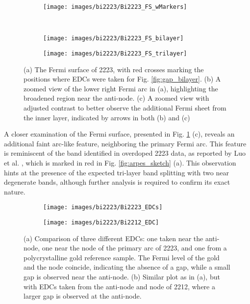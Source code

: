 \begin{figure}[t!]
	\centering
	\begin{subfigure}[b]{0.6\textwidth}
		\texttt{[image: images/bi2223/Bi2223\_FS\_wMarkers]}
		\caption{}
	\end{subfigure}
	\\
	\begin{subfigure}[b]{0.6\textwidth}
		\texttt{[image: images/bi2223/Bi2223\_FS\_bilayer]}
		\caption{}
	\end{subfigure}
	\begin{subfigure}[b]{0.3\textwidth}
		\texttt{[image: images/bi2223/Bi2223\_FS\_trilayer]}
		\caption{}
	\end{subfigure}
	\caption{(a) The Fermi surface of 2223, with red crosses marking the positions where EDCs were taken for Fig. \ref{fig:gap_bilayer}. (b) A zoomed view of the lower right Fermi arc in (a), highlighting the broadened region near the anti-node. (c) A zoomed view with adjusted contrast to better observe the additional Fermi sheet from the inner  layer, indicated by arrows in both (b) and (c)}
	\label{fig:bi2223_fs}
\end{figure}

A closer examination of the Fermi surface, presented in Fig. \ref{fig:bi2223_fs} (c), reveals an additional faint arc-like feature, neighboring the primary Fermi arc.
This feature is reminiscent of the band identified in overdoped 2223 data, as reported by Luo et al. \cite{luo_electronic_2023}, which is marked in red in Fig.  \ref{fig:arpes_sketch} (a).
This observation hints at the presence of the expected tri-layer band splitting with two near degenerate bands, although further analysis is required to confirm its exact nature.

\begin{figure}[t]
	\centering
	\begin{subfigure}[b]{0.49\textwidth}
		\texttt{[image: images/bi2223/Bi2223\_EDCs]}
		\caption{}
	\end{subfigure}
	\begin{subfigure}[b]{0.49\textwidth}
		\texttt{[image: images/bi2223/Bi2212\_EDC]}
		\caption{}
	\end{subfigure}
	\caption{(a) Comparison of three different EDCs: one taken near the anti-node, one near the node of the primary arc of 2223, and one from a polycrystalline gold reference sample. The Fermi level of the gold and the node coincide, indicating the absence of a gap, while a small gap is observed near the anti-node. (b) Similar plot as in (a), but with EDCs taken from the anti-node and node of 2212, where a larger gap is observed at the anti-node.}
	\label{fig:edc_comparison}
\end{figure}


